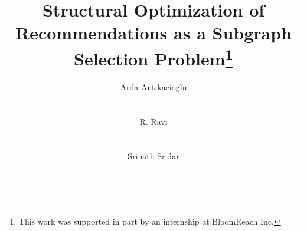 \documentclass{sig-alternate}
\begin{document}
\title{Structural Optimization of Recommendations as a Subgraph Selection Problem\thanks{This work was supported in part by an internship at BloomReach Inc.}}

\author{
\alignauthor
Arda Antikacioglu \\
       \\
       \\
\alignauthor
R. Ravi \\
       \\
       \\
\alignauthor
Srinath Sridar \\
       \\
}

\maketitle











\pagebreak
\setcounter{page}{1}
{}

\end{document}
